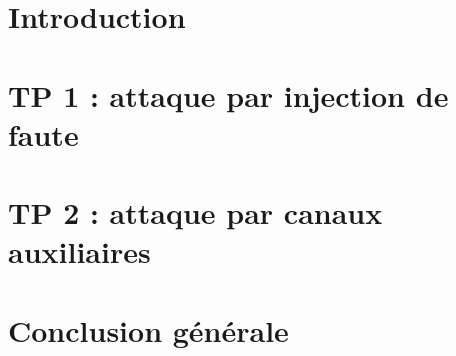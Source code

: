 
\section{Introduction}


\section{TP 1 : attaque par injection de faute}


\section{TP 2 : attaque par canaux auxiliaires}


\section{Conclusion générale}

